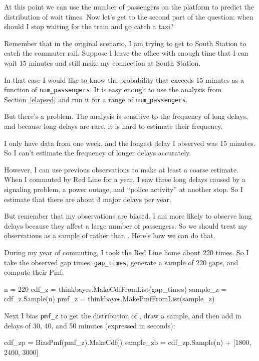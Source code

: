 \documentclass[12pt]{book}
\theoremstyle{exercise}
\begin{document}
At this point we can use the number of passengers on the platform
to predict the distribution of wait times.  Now
let's get to the second part of the question: when should I stop
waiting for the train and go catch a taxi?

Remember that in the original scenario, I am trying to get to
South Station to catch the commuter rail.  Suppose I leave
the office with enough time that I can wait 15 minutes
and still make my connection at South Station.

In that case I would like to know the probability that  exceeds
15 minutes as a function of \verb"num_passengers".  It is easy enough
to use the
analysis from Section~\ref{elapsed} and run it for a range of
\verb"num_passengers".

But there's a problem.
The analysis is sensitive to the frequency of long delays, and
because long delays are rare, it is hard to estimate
their frequency.

I only have data from one week,
and the longest delay I observed was 15 minutes.  So I can't
estimate the frequency of longer delays accurately.

However, I can use previous observations to make at least a coarse
estimate.  When I commuted by Red Line for a year, I saw three long
delays caused by a signaling problem, a power outage, and ``police
activity'' at another stop.  So I estimate that there are about
3 major delays per year.

But remember that my observations are biased.  I am more likely
to observe long delays because they affect a large number
of passengers.  So we should treat my observations as a sample
of  rather than .  Here's how we can do that.

During my year of commuting, I took the Red Line home about 220
times.  So I take the observed gap times, \verb"gap_times",
generate a sample of 220 gaps, and compute their Pmf:

\begin{code}
    n = 220
    cdf_z = thinkbayes.MakeCdfFromList(gap_times)
    sample_z = cdf_z.Sample(n)
    pmf_z = thinkbayes.MakePmfFromList(sample_z)
\end{code}

Next I bias \verb"pmf_z" to get the distribution of
, draw a sample, and then add in delays of
30, 40, and 50 minutes (expressed in seconds):

\begin{code}
    cdf_zp = BiasPmf(pmf_z).MakeCdf()
    sample_zb = cdf_zp.Sample(n) + [1800, 2400, 3000]
\end{code}
\end{document}
